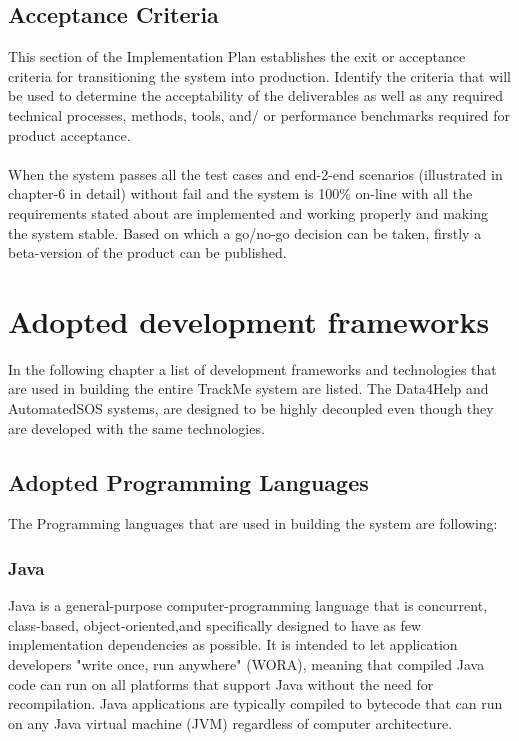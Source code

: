 \documentclass[a4paper, hidelinks, 12pt]{report}
\begin{document}
\section{Acceptance Criteria}
This section of the Implementation Plan establishes the exit or acceptance criteria for transitioning the system into production. Identify the criteria that will be used to determine the acceptability of the deliverables as well as any required technical processes, methods, tools, and/ or performance benchmarks required for product acceptance. \\\\
When the system passes all the test cases and end-2-end scenarios (illustrated in chapter-6 in detail) without fail and the system is 100\% on-line with all the requirements stated about are implemented and working properly and making the system stable. Based on which a go/no-go decision can be taken, firstly a beta-version of the product can be published.
	
	\chapter{Adopted development frameworks}
In the following chapter a list of development frameworks and technologies that are used in building the entire TrackMe system are listed. The Data4Help and AutomatedSOS systems, are designed to be highly decoupled even though they are developed with the same technologies.
	\section{Adopted Programming Languages}
	The Programming languages that are used in building the system are following:
	\subsection{Java} Java is a general-purpose computer-programming language that is concurrent, class-based, object-oriented,and specifically designed to have as few implementation dependencies as possible. It is intended to let application developers "write once, run anywhere" (WORA), meaning that compiled Java code can run on all platforms that support Java without the need for recompilation. Java applications are typically compiled to bytecode that can run on any Java virtual machine (JVM) regardless of computer architecture.
	
\end{document}
